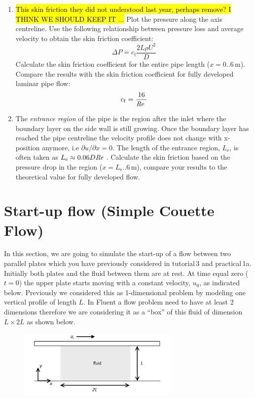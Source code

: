 \documentclass[11pt,a4paper,oneside,hidelinks]{scrartcl}
\newcommand\Rey{\mbox{\textit{Re}}\,\,}
\begin{document}
\begin{enumerate}
\item \hl{This skin friction they did not understood last year, perhaps remove? I THINK WE SHOULD KEEP IT ...} Plot the pressure along the axis centreline. Use the following relationship between pressure loss and average velocity to obtain the skin friction coefficient: 
\begin{equation}
    \Delta P=c_\mathrm{f}\frac{2L\rho U^2}{D}
\end{equation}
Calculate the skin friction coefficient for the entire pipe length ($x=0..6$\,m). Compare the results with the skin friction coefficient for fully developed laminar pipe flow:
\begin{equation}
    c_\mathrm{f}=\frac{16}{\Rey}
\end{equation}
\item The \emph{entrance region} of the pipe is the region after the inlet where the boundary layer on the side wall is still growing. Once the boundary layer has reached the pipe centreline the velocity profile does not change with x-position anymore, i.e  $\partial u/\partial x=0$. The length of the entrance region, $L_\mathrm{e}$, is often taken as $L_\mathrm{e}\approx0.06D\Rey$. Calculate the skin friction based on the pressure drop in the region ($x=L_\mathrm{e}..6$\,m), compare your results to the theoretical value for fully developed flow.
\end{enumerate}

\section{Start-up flow (Simple Couette Flow)}

In this section, we are going to simulate the start-up of a flow between two parallel plates which you have previously considered in tutorial\,3 and practical\,1a. Initially both plates and the fluid between them are at rest. At time equal zero ($t=0$) the upper plate starts moving with a constant velocity, $u_0$, as indicated below. Previously we considered this as 1-dimensional problem by modeling one vertical profile of length $L$. In Fluent a flow problem need to have at least 2 dimensions therefore we are considering it as a ``box'' of this fluid of dimension $L\times 2L$ as shown below.

\begin{figure}[H]
\begin{center}
\includegraphics[width=0.7\textwidth,clip]{start_up_flow.png}
\end{center}
\end{figure}
\end{document}

